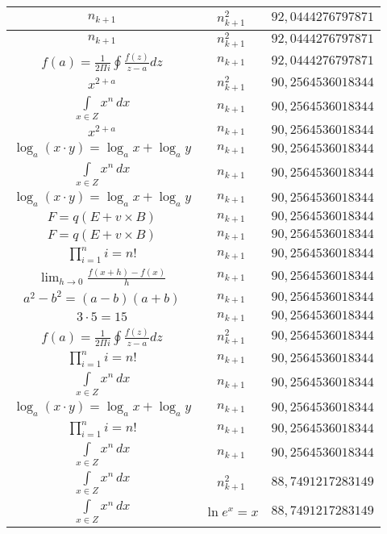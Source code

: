 \documentclass{article}
\begin{document}
\begin{flushleft}
\begin{longtable}{|c|c|c|}
$n_{k+1}$ & $n_{k+1}^2$ & $92,0444276797871$ \\ \hline 
$n_{k+1}$ & $n_{k+1}^2$ & $92,0444276797871$ \\ \hline 
$f\left(a\right)=\frac{1}{2\Pi i}\oint\frac{f\left(z\right)}{z-a}dz$ & $n_{k+1}$ & $92,0444276797871$ \\ \hline 
$x^{2+a}$ & $n_{k+1}^2$ & $90,2564536018344$ \\ \hline 
$\int \limits_{x\in Z}\!x^{n}\,dx$ & $n_{k+1}$ & $90,2564536018344$ \\ \hline 
$x^{2+a}$ & $n_{k+1}$ & $90,2564536018344$ \\ \hline 
$\log_{a}(x\cdot y)=\log_{a}x+\log_{a}y$ & $n_{k+1}$ & $90,2564536018344$ \\ \hline 
$\int \limits_{x\in Z}\!x^{n}\,dx$ & $n_{k+1}$ & $90,2564536018344$ \\ \hline 
$\log_{a}(x\cdot y)=\log_{a}x+\log_{a}y$ & $n_{k+1}$ & $90,2564536018344$ \\ \hline 
$F=q\left(E+v\times B\right)$ & $n_{k+1}$ & $90,2564536018344$ \\ \hline 
$F=q\left(E+v\times B\right)$ & $n_{k+1}$ & $90,2564536018344$ \\ \hline 
$\prod_{i=1}^ni=n!$ & $n_{k+1}$ & $90,2564536018344$ \\ \hline 
$\lim_{h\to0}\frac{f(x+h)-f(x)}{h}$ & $n_{k+1}$ & $90,2564536018344$ \\ \hline 
$a^2-b^2=(a-b)(a+b)$ & $n_{k+1}$ & $90,2564536018344$ \\ \hline 
$3\cdot 5=15$ & $n_{k+1}$ & $90,2564536018344$ \\ \hline 
$f\left(a\right)=\frac{1}{2\Pi i}\oint\frac{f\left(z\right)}{z-a}dz$ & $n_{k+1}^2$ & $90,2564536018344$ \\ \hline 
$\prod_{i=1}^ni=n!$ & $n_{k+1}$ & $90,2564536018344$ \\ \hline 
$\int \limits_{x\in Z}\!x^{n}\,dx$ & $n_{k+1}$ & $90,2564536018344$ \\ \hline 
$\log_{a}(x\cdot y)=\log_{a}x+\log_{a}y$ & $n_{k+1}$ & $90,2564536018344$ \\ \hline 
$\prod_{i=1}^ni=n!$ & $n_{k+1}$ & $90,2564536018344$ \\ \hline 
$\int \limits_{x\in Z}\!x^{n}\,dx$ & $n_{k+1}$ & $90,2564536018344$ \\ \hline 
$\int \limits_{x\in Z}\!x^{n}\,dx$ & $n_{k+1}^2$ & $88,7491217283149$ \\ \hline 
$\int \limits_{x\in Z}\!x^{n}\,dx$ & $\ln e^x=x$ & $88,7491217283149$ \\ \hline 

\end{longtable}
\end{flushleft}
\end{document}
